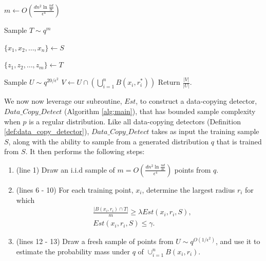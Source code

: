 \begin{algorithm}    

\caption{$DataCopyDetect(S, q, m)$}
\label{alg:main}   

   \DontPrintSemicolon
   
   $m \leftarrow O\left(\frac{dn^2\ln \frac{nd}{\delta\epsilon}}{\epsilon^4}\right)$\;
   
   Sample $T \sim q^m$\;
   
   $\{x_1, x_2, \dots, x_n\} \leftarrow S$\;
   
   $\{z_1, z_2, \dots, z_m\} \leftarrow T$\;

	Sample $U \sim q^{20/\epsilon^2}$\;
	$V \leftarrow U \cap \left(\bigcup_{i=1}^n B(x_i, r_i^*)\right)$\;
	Return $\frac{|V|}{|U|}$.\;
	
	

\end{algorithm}


We now now leverage our subroutine, $Est$, to construct a data-copying detector, $Data\_Copy\_Detect$ (Algorithm \ref{alg:main}), that has bounded sample complexity when $p$ is a regular distribution. Like all data-copying detectors (Definition \ref{def:data_copy_detector}), $Data\_Copy\_Detect$ takes as input the training sample $S$, along with the ability to sample from a generated distribution $q$ that is trained from $S$. It then performs the following steps:
\begin{enumerate}
	\item (line 1) Draw an i.i.d sample of $m = O\left(\frac{dn^2\ln \frac{nd}{\delta\epsilon}}{\epsilon^4}\right)$ points from $q$. 
	\item (lines 6 - 10) For each training point, $x_i$, determine the largest radius $r_i$ for which 
	\begin{equation*}
	\begin{split}
	&\frac{|B(x_i, r_i) \cap T|}{m} \geq \lambda Est(x_i, r_i ,S), \\ 
	&Est(x_i, r_i , S) \leq \gamma.
	\end{split}
	\end{equation*}
	\item (lines 12 - 13) Draw a fresh sample of points from $U \sim q^{O(1/\epsilon^2)}$, and use it to estimate the probability mass under $q$ of $\cup_{i=1}^n B(x_i, r_i)$.
\end{enumerate}

